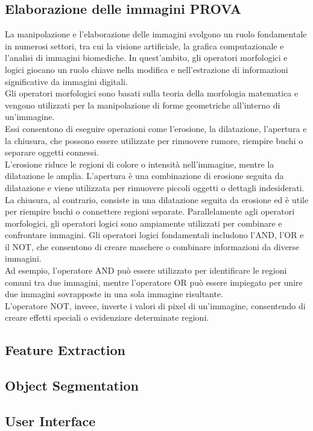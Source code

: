\documentclass[a4paper,12pt]{report}
\begin{document}
    \subsection{Elaborazione delle immagini PROVA}
      La manipolazione e l'elaborazione delle immagini svolgono un ruolo fondamentale in numerosi settori, tra cui la visione artificiale, la grafica computazionale e l'analisi di immagini biomediche. 
      In quest'ambito, gli operatori morfologici e logici giocano un ruolo chiave nella modifica e nell'estrazione di informazioni significative da immagini digitali. \\
      Gli operatori morfologici sono basati sulla teoria della morfologia matematica e vengono utilizzati per la manipolazione di forme geometriche all'interno di un'immagine. \\
      Essi consentono di eseguire operazioni come l'erosione, la dilatazione, l'apertura e la chiusura, che possono essere utilizzate per rimuovere rumore, riempire buchi o separare oggetti connessi. \\
      L'erosione riduce le regioni di colore o intensità nell'immagine, mentre la dilatazione le amplia. L'apertura è una combinazione di erosione seguita da dilatazione e viene utilizzata per rimuovere piccoli oggetti o dettagli indesiderati. La chiusura, al contrario, consiste in una dilatazione seguita da erosione ed è utile per riempire buchi o connettere regioni separate.
      Parallelamente agli operatori morfologici, gli operatori logici sono ampiamente utilizzati per combinare e confrontare immagini. Gli operatori logici fondamentali includono l'AND, l'OR e il NOT, che consentono di creare maschere o combinare informazioni da diverse immagini. \\
      Ad esempio, l'operatore AND può essere utilizzato per identificare le regioni comuni tra due immagini, mentre l'operatore OR può essere impiegato per unire due immagini sovrapposte in una sola immagine risultante. \\
      L'operatore NOT, invece, inverte i valori di pixel di un'immagine, consentendo di creare effetti speciali o evidenziare determinate regioni.
    \subsection{Feature Extraction}
    \subsection{Object Segmentation}
    \subsection{User Interface}
\end{document}
